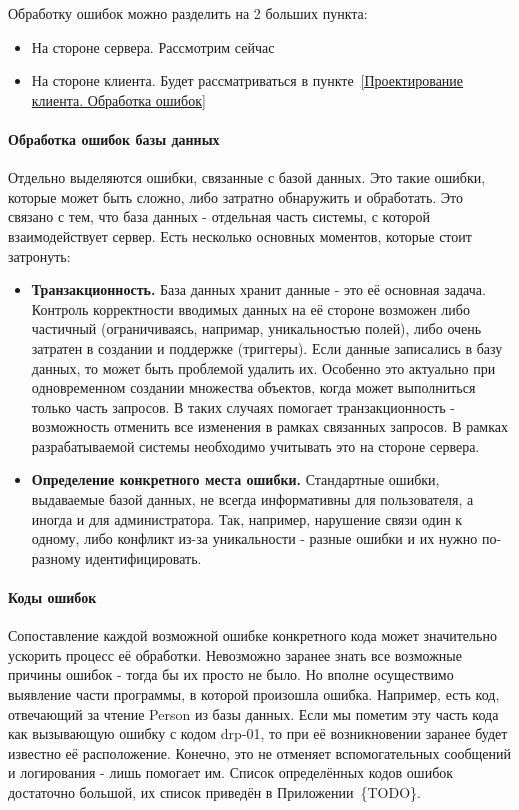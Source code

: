 \documentclass[a4paper,article]{article}
\begin{document}
    Обработку ошибок можно разделить на 2 больших пункта:

    \begin{itemize}[nolistsep]
        \item На стороне сервера. Рассмотрим сейчас
        \item На стороне клиента. Будет рассматриваться в пункте~\ref{Проектирование клиента. Обработка ошибок}
    \end{itemize}

    \paragraph{Обработка ошибок базы данных}

    Отдельно выделяются ошибки, связанные с базой данных. Это такие ошибки, которые может быть сложно, либо затратно обнаружить и обработать. Это связано с тем, что база данных - отдельная часть системы, с которой взаимодействует сервер. Есть несколько основных моментов, которые стоит затронуть:

    \begin{itemize}[nolistsep]
        \item \textbf{Транзакционность.} База данных хранит данные - это её основная задача. Контроль корректности вводимых данных на её стороне возможен либо частичный (ограничиваясь, напримар, уникальностью полей), либо очень затратен в создании и поддержке (триггеры). Если данные записались в базу данных, то может быть проблемой удалить их. Особенно это актуально при одновременном создании множества объектов, когда может выполниться только часть запросов. В таких случаях помогает транзакционность - возможность отменить все изменения в рамках связанных запросов. В рамках разрабатываемой системы необходимо учитывать это на стороне сервера.
        \item \textbf{Определение конкретного места ошибки.} Стандартные ошибки, выдаваемые базой данных, не всегда информативны для пользователя, а иногда и для администратора. Так, например, нарушение связи один к одному, либо конфликт из-за уникальности - разные ошибки и их нужно по-разному идентифицировать.
    \end{itemize}

    \paragraph{Коды ошибок}\label{Проектирование сервера. Коды ошибок}

    Сопоставление каждой возможной ошибке конкретного кода может значительно ускорить процесс её обработки. Невозможно заранее знать все возможные причины ошибок - тогда бы их просто не было. Но вполне осуществимо выявление части программы, в которой произошла ошибка. Например, есть код, отвечающий за чтение Person из базы данных. Если мы пометим эту часть кода как вызывающую ошибку с кодом drp-01, то при её возникновении заранее будет известно её расположение. Конечно, это не отменяет вспомогательных сообщений и логирования - лишь помогает им. Список определённых кодов ошибок достаточно большой, их список приведён в Приложении~\{TODO\}.
\end{document}
